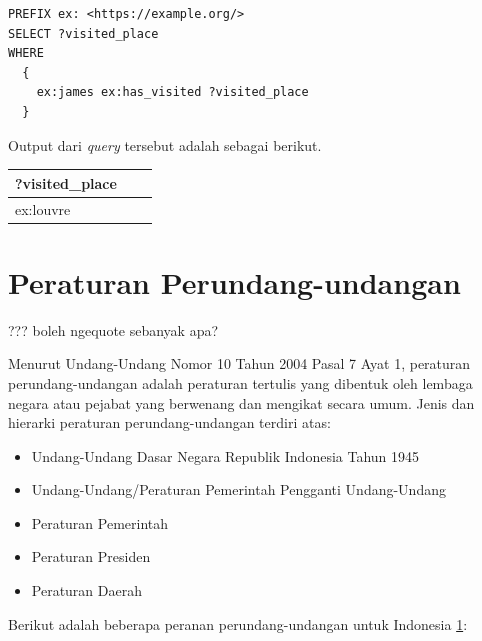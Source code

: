 \begin{verbatim}
PREFIX ex: <https://example.org/>
SELECT ?visited_place
WHERE
  {
    ex:james ex:has_visited ?visited_place
  }
\end{verbatim}

Output dari \textit{query} tersebut adalah sebagai berikut.

\begin{longtable}{|l|l|l|} \hline
  ?visited\_place \\ \hline \endhead
  ex:louvre       \\ \hline
\end{longtable}

\section{Peraturan Perundang-undangan}\label{peraturan-perundang-undangan}

??? boleh ngequote sebanyak apa?

Menurut Undang-Undang Nomor 10 Tahun 2004 Pasal 7 Ayat 1, peraturan perundang-undangan adalah
peraturan tertulis yang dibentuk oleh lembaga negara atau pejabat yang berwenang dan mengikat secara
umum. Jenis dan hierarki peraturan perundang-undangan terdiri atas:

\begin{itemize}
  \itemsep1pt\parskip0pt
  \item Undang-Undang Dasar Negara Republik Indonesia Tahun 1945
  \item Undang-Undang/Peraturan Pemerintah Pengganti Undang-Undang
  \item Peraturan Pemerintah
  \item Peraturan Presiden
  \item Peraturan Daerah
\end{itemize}

Berikut adalah beberapa peranan perundang-undangan untuk Indonesia
\href{https://www.pustaka.ut.ac.id/lib/wp-content/uploads/pdfmk/HKUM4403-M1.pdf}{1}:

